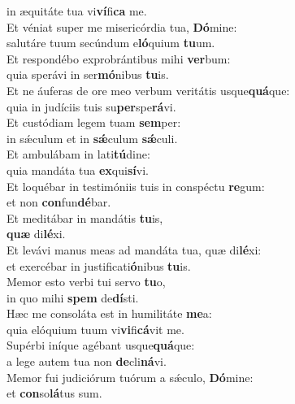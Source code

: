 \evenverse in æquitáte tua vi\textbf{ví}fi\textbf{ca} me.\\
\oddverse Et véniat super me misericórdia tua, \textbf{Dó}mine:~\*\\
\oddverse salutáre tuum secúndum e\textbf{ló}quium \textbf{tu}um.\\
\evenverse Et respondébo exprobrántibus mihi \textbf{ver}bum:~\*\\
\evenverse quia sperávi in ser\textbf{mó}nibus \textbf{tu}is.\\
\oddverse Et ne áuferas de ore meo verbum veritátis usque\textbf{quá}que:~\*\\
\oddverse quia in judíciis tuis su\textbf{per}spe\textbf{rá}vi.\\
\evenverse Et custódiam legem tuam \textbf{sem}per:~\*\\
\evenverse in sǽculum et in \textbf{sǽ}culum \textbf{sǽ}culi.\\
\oddverse Et ambulábam in lati\textbf{tú}dine:~\*\\
\oddverse quia mandáta tua \textbf{ex}qui\textbf{sí}vi.\\
\evenverse Et loquébar in testimóniis tuis in conspéctu \textbf{re}gum:~\*\\
\evenverse et non \textbf{con}fun\textbf{dé}bar.\\
\oddverse Et meditábar in mandátis \textbf{tu}is,~\*\\
\oddverse \textbf{quæ} di\textbf{lé}xi.\\
\evenverse Et levávi manus meas ad mandáta tua, quæ di\textbf{lé}xi:~\*\\
\evenverse et exercébar in justificati\textbf{ó}nibus \textbf{tu}is.\\
\oddverse Memor esto verbi tui servo \textbf{tu}o,~\*\\
\oddverse in quo mihi \textbf{spem} de\textbf{dí}sti.\\
\evenverse Hæc me consoláta est in humilitáte \textbf{me}a:~\*\\
\evenverse quia elóquium tuum vi\textbf{vi}fi\textbf{cá}vit me.\\
\oddverse Supérbi iníque agébant usque\textbf{quá}que:~\*\\
\oddverse a lege autem tua non \textbf{de}cli\textbf{ná}vi.\\
\evenverse Memor fui judiciórum tuórum a sǽculo, \textbf{Dó}mine:~\*\\
\evenverse et \textbf{con}so\textbf{lá}tus sum.\\
